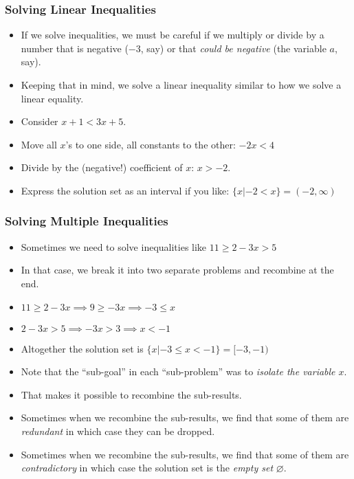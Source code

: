 \documentclass[serif,ignorenonframetext]{beamer}
\begin{document}
\begin{frame}
  \frametitle{Solving Linear Inequalities}
  \begin{itemize}[<+->]
  \item If we solve inequalities, we must be careful if we multiply or divide
    by a number that is negative ($-3$, say) or that \textit{could be negative}
    (the variable $a$, say).
  \item Keeping that in mind, we solve a linear inequality similar to how we
    solve a linear equality.
  \item Consider $x+1 < 3x+5$.
  \item Move all $x$'s to one side, all constants to the other:
    $-2x < 4$
  \item Divide by the (negative!) coefficient of $x$: $x>-2$.
  \item Express the solution set as an interval if you like: 
    $\{x|-2<x\}=(-2,\infty)$
  \end{itemize}
\end{frame}

\begin{frame}
  \frametitle{Solving Multiple Inequalities}
  \begin{itemize}[<+->]
  \item Sometimes we need to solve inequalities like $11\ge 2-3x>5$
  \item In that case, we break it into two separate problems and
    recombine at the end.
  \item $11\ge 2-3x \implies 9\ge -3x \implies -3 \le x$
  \item $2-3x > 5 \implies -3x > 3 \implies x < -1$
  \item Altogether the solution set is $\{x|-3\le x < -1\} = [-3,-1)$
  \item Note that the ``sub-goal'' in each ``sub-problem'' was to 
    \textit{isolate the variable $x$}.
  \item That makes it possible to recombine the sub-results.
  \item Sometimes when we recombine the sub-results, we find that some
    of them are \textit{redundant} in which case they can be dropped.
  \item Sometimes when we recombine the sub-results, we find that some
    of them are \textit{contradictory} in which case the solution set
    is the \textit{empty set} $\varnothing$.
  \end{itemize}
\end{frame}
\end{document}
